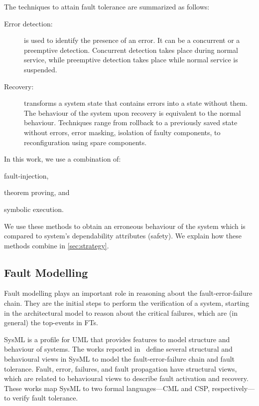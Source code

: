 \documentclass[12pt,openright,twoside,a4paper,oldfontcommands,english,brazil,draft]{abntex2}
\theoremstyle{theo}
\begin{document}
The techniques to attain fault tolerance are summarized as follows:
\begin{description}
  \item[Error detection:] is used to identify the presence of an error.
  It can be a concurrent or a preemptive detection.
  Concurrent detection takes place during normal service, while preemptive detection takes place while normal service is suspended.
  \item[Recovery:] transforms a system state that contains errors into a state without them. The behaviour of the system upon recovery is equivalent to the normal behaviour.
  Techniques range from rollback to a previously saved state without errors, error masking, isolation of faulty components, to reconfiguration using spare components.
\end{description}

In this work, we use a combination of:
\begin{alineasinline}
  \item fault-injection,
  \item theorem proving, and
  \item symbolic execution.
\end{alineasinline}
We use these methods to obtain an erroneous behaviour of the system which is compared to system's dependability attributes (safety).
We explain how these methods combine in \cref{sec:strategy}.

\subsection{Fault Modelling}

Fault modelling plays an important role in reasoning about the fault-error-failure chain.
They are the initial steps to perform the verification of a system, starting in the architectural model to reason about the critical failures, which are (in general) the top-events in \acp{FT}.

\Ac{SysML} is a profile for \ac{UML} that provides features to model structure and behaviour of systems.
The works reported in~\cite{APR+2013,ADP+2013} define several structural and behavioural views in \ac{SysML} to model the fault-error-failure chain and fault tolerance.
Fault, error, failures, and fault propagation have structural views, which are related to behavioural views to describe fault activation and recovery.
These works map \ac{SysML} to two formal languages---\ac{CML} and \ac{CSP}, respectively---to verify fault tolerance.
\end{document}
